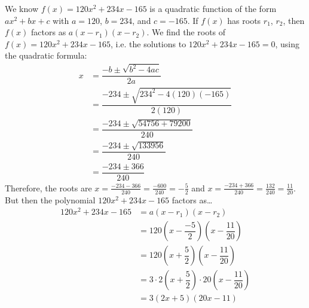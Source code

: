\documentclass[11pt,letterpaper]{article}
\begin{document}
\sol We know $f(x)=120x^2 + 234x - 165$ is a quadratic function of the form $ax^2 + bx + c$ with $a= 120$, $b= 234$, and $c= -165$. If $f(x)$ has roots $r_1$, $r_2$, then $f(x)$ factors as $a(x - r_1)(x - r_2)$. We find the roots of $f(x)= 120x^2 + 234x - 165$, i.e. the solutions to $120x^2 + 234x - 165= 0$, using the quadratic formula:
	\[
	\begin{aligned}
	x&= \dfrac{-b \pm \sqrt{b^2 - 4ac}}{2a} \\
	&= \dfrac{-234 \pm \sqrt{234^2 - 4(120)(-165)}}{2(120)} \\
	&= \dfrac{-234 \pm \sqrt{54756 + 79200}}{240} \\
	&= \dfrac{-234 \pm \sqrt{133956}}{240} \\
	&= \dfrac{-234 \pm 366}{240}
	\end{aligned}
	\]
Therefore, the roots are $x= \frac{-234 - 366}{240}= \frac{-600}{240}= -\frac{5}{2}$ and $x= \frac{-234 + 366}{240}= \frac{132}{240}= \frac{11}{20}$. But then the polynomial $120x^2 + 234x - 165$ factors as\dots
	\[
	\begin{aligned}
	120x^2 + 234x - 165&= a(x - r_1)(x - r_2) \\
	&= 120 \left( x - \dfrac{-5}{2} \right) \left( x - \dfrac{11}{20} \right) \\
	&= 120 \left( x + \dfrac{5}{2} \right) \left( x - \dfrac{11}{20} \right) \\
	&= 3 \cdot 2 \left( x + \dfrac{5}{2} \right) \cdot 20 \left( x - \dfrac{11}{20} \right) \\
	&= 3(2x + 5)(20x - 11)
	\end{aligned}
	\]
\end{document}
